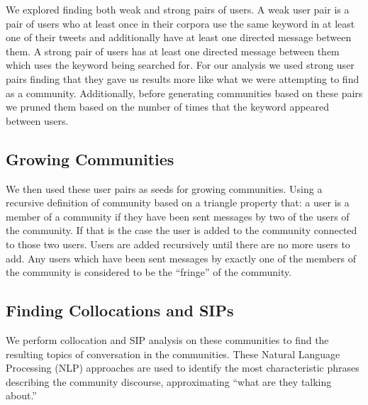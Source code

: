 We explored finding both weak and strong pairs of users.  A weak user pair is a pair of users who at least once in their corpora use the same keyword in at least one of their tweets and additionally have at least one directed message between them.  A strong pair of users has at least one directed message between them which uses the keyword being searched for.  For our analysis we used strong user pairs finding that they gave us results more like what we were attempting to find as a community.  Additionally, before generating communities based on these pairs we pruned them based on the number of times that the keyword appeared between users.

\subsection{Growing Communities}

We then used these user pairs as seeds for growing communities.  Using a recursive definition of community based on a triangle property that: a user is a member of a community if they have been sent messages by two of the users of the community.  If that is the case the user is added to the community connected to those two users. Users are added recursively until there are no more users to add.  Any users which have been sent messages by exactly one of the members of the community is considered to be the ``fringe'' of the community.

\subsection{Finding Collocations and SIPs}

We perform collocation and SIP analysis on these communities to find the resulting topics of conversation in the communities.  These Natural Language Processing (NLP) approaches are used to identify the most characteristic phrases describing the community discourse, approximating ``what are they talking about.''
